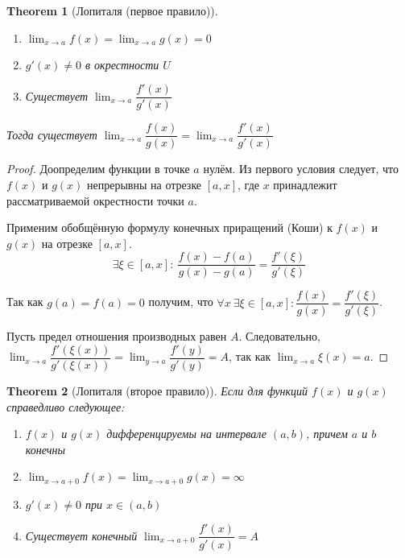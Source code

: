 \documentclass[a4paper]{article}
\theoremstyle{named}
\newtheorem*{namedtheorem}{Theorem}
\begin{document}
\begin{colloq}
\begin{namedtheorem}[Лопиталя (первое правило)]
\begin{enumerate}
				\item
				$\lim_{x \to a} f(x) = \lim_{x \to a} g(x) = 0$

				\item
				$g'(x) \neq 0$ в окрестности $U$

				\item
				Существует $\lim_{x \to a} \dfrac{f'(x)}{g'(x)}$
			\end{enumerate}

			Тогда существует $\lim_{x \to a} \dfrac{f(x)}{g(x)} = \lim_{x \to a} \dfrac{f'(x)}{g'(x)}$
		\end{namedtheorem}

		\begin{proof}
			Доопределим функции в точке $a$ нулём. Из первого условия следует, что $f(x)$ и $g(x)$ непрерывны на отрезке $[a, x]$, где $x$ принадлежит рассматриваемой окрестности точки $a$. 

			Применим обобщённую формулу конечных приращений (Коши) к $f(x)$ и $g(x)$ на отрезке $[a, x]$.
			\begin{equation*}
				\exists \xi \in [a, x]: \ \dfrac{f(x) - f(a)}{g(x) - g(a)} = \dfrac{f'(\xi)}{g'(\xi)}
			\end{equation*}

			Так как $g(a) = f(a) = 0$ получим, что $\forall x \ \exists \xi \in [a, x]: \dfrac{f(x)}{g(x)} = \dfrac{f'(\xi)}{g'(\xi)}$.

			Пусть предел отношения производных равен $A$. Следовательно, $\lim_{x \to a} \dfrac{f'(\xi(x))}{g'(\xi(x))} = \lim_{y \to a} \dfrac{f'(y)}{g'(y)} = A$, так как $\lim_{x \to a} \xi(x) = a$.
		\end{proof}

		\begin{namedtheorem}[Лопиталя (второе правило)]
			Если для функций $f(x)$ и $g(x)$ справедливо следующее:

			\begin{enumerate}
				\item
				$f(x)$ и $g(x)$ дифференцируемы на интервале $(a, b)$, причем $a$ и $b$ конечны

				\item
				$\lim_{x \to a + 0} f(x) = \lim_{x \to a + 0} g(x) = \infty$

				\item
				$g'(x) \neq 0$ при $x \in (a, b)$

				\item
				Существует конечный $\lim_{x \to a + 0} \dfrac{f'(x)}{g'(x)} = A$
			\end{enumerate}


\end{namedtheorem}
\end{colloq}
\end{document}

